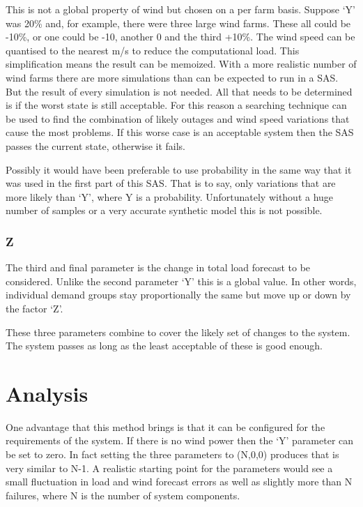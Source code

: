 \documentclass[a4paper,oneside,12pt]{report}
\begin{document}
This is not a global property of wind but chosen on a per farm basis. Suppose `Y' was 20\% and, for example, there were three large wind farms. These all could be -10\%, or one could be -10, another 0 and the third +10\%. The wind speed can be quantised to the nearest m/s to reduce the computational load. This simplification means the result can be memoized. With a more realistic number of wind farms there are more simulations than can be expected to run in a SAS. But the result of every simulation is not needed. All that needs to be determined is if the worst state is still acceptable. For this reason a searching technique can be used to find the combination of likely outages and wind speed variations that cause the most problems. If this worse case is an acceptable system then the SAS passes the current state, otherwise it fails.

Possibly it would have been preferable to use probability in the same way that it was used in the first part of this SAS. That is to say, only variations that are more likely than `Y', where Y is a probability. Unfortunately without a huge number of samples or a very accurate synthetic model this is not possible.

\subsubsection{Z}

The third and final parameter is the change in total load forecast to be considered. Unlike the second parameter `Y' this is a global value. In other words, individual demand groups stay proportionally the same but move up or down by the factor `Z'.

These three parameters combine to cover the likely set of changes to the system. The system passes as long as the least acceptable of these is good enough.

\section{Analysis}

One advantage that this method brings is that it can be configured for the requirements of the system. If there is no wind power then the `Y' parameter can be set to zero. In fact setting the three parameters to (N,0,0) produces that is very similar to N-1. A realistic starting point for the parameters would see a small fluctuation in load and wind forecast errors as well as slightly more than N failures, where N is the number of system components.
\end{document}
